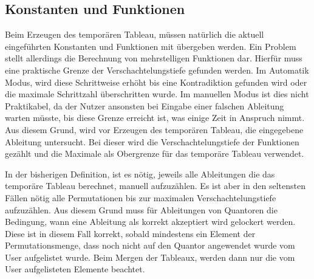 \subsection{Konstanten und Funktionen}
Beim Erzeugen des temporären Tableau, müssen natürlich die aktuell eingeführten Konstanten und Funktionen mit übergeben werden. Ein Problem stellt allerdings die Berechnung von mehrstelligen Funktionen dar. Hierfür muss eine praktische Grenze der Verschachtelungstiefe gefunden werden. Im Automatik Modus, wird diese Schrittweise erhöht bis eine Kontradiktion gefunden wird oder die maximale Schrittzahl überschritten wurde. Im manuellen Modus ist dies nicht Praktikabel, da der Nutzer ansonsten bei Eingabe einer falschen Ableitung warten müsste, bis diese Grenze erreicht ist, was einige Zeit in Anspruch nimmt. Aus diesem Grund, wird vor Erzeugen des temporären Tableau, die eingegebene Ableitung untersucht. Bei dieser wird die Verschachtelungstiefe der Funktionen gezählt und die Maximale als Obergrenze für das temporäre Tableau verwendet.

In der bisherigen Definition, ist es nötig, jeweils alle Ableitungen die das temporäre Tableau berechnet, manuell aufzuzählen. Es ist aber in den seltensten Fällen nötig alle Permutationen bis zur maximalen Verschachtelungstiefe aufzuzählen. Aus diesem Grund muss für Ableitungen von Quantoren die Bedingung, wann eine Ableitung als korrekt akzeptiert wird gelockert werden. Diese ist in diesem Fall korrekt, sobald mindestens ein Element der Permutationsmenge, dass noch nicht auf den Quantor angewendet wurde vom User aufgelistet wurde. Beim Mergen der Tableaux, werden dann nur die vom User aufgelisteten Elemente beachtet.





